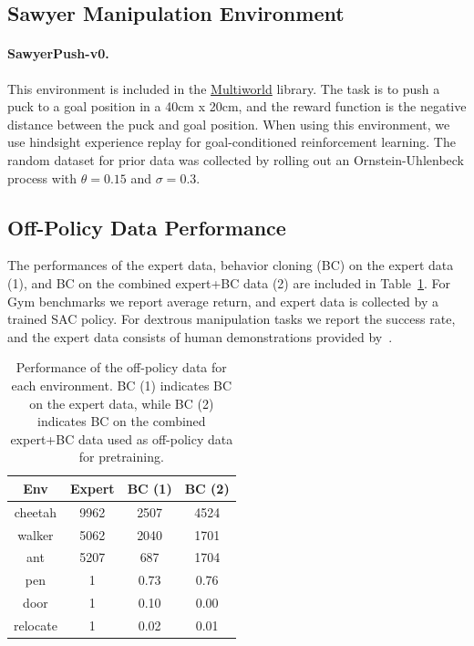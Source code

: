\subsection{Sawyer Manipulation Environment}

\paragraph{SawyerPush-v0.} This environment is included in the \href{https://github.com/vitchyr/multiworld}{Multiworld} library. The task is to push a puck to a goal position in a 40cm x 20cm, and the reward function is the negative distance between the puck and goal position. When using this environment, we use hindsight experience replay for goal-conditioned reinforcement learning. The random dataset for prior data was collected by rolling out an Ornstein-Uhlenbeck process with $\theta = 0.15$ and $\sigma = 0.3$.

\subsection{Off-Policy Data Performance}

The performances of the expert data, behavior cloning (BC) on the expert data (1), and BC on the combined expert+BC data (2) are included in Table~\ref{fig:bc}. For Gym benchmarks we report average return, and expert data is collected by a trained SAC policy. For dextrous manipulation tasks we report the success rate, and the expert data consists of human demonstrations provided by~\citet{rajeswaran2018dextrous}.

\begin{table}[h!]
\footnotesize
\begin{tabular}{c|c|c|c}
Env         & Expert & BC (1) & BC (2) \\ \hline
cheetah & 9962   & 2507         & 4524      \\
walker      & 5062   & 2040         & 1701      \\
ant         & 5207   & 687          & 1704      \\
pen         & 1      & 0.73          & 0.76       \\
door        & 1      & 0.10          & 0.00       \\
relocate    & 1      & 0.02          & 0.01       \\
\end{tabular}
\caption{Performance of the off-policy data for each environment. BC (1) indicates BC on the expert data, while BC (2) indicates BC on the combined expert+BC data used as off-policy data for pretraining. }
\label{fig:bc}
\end{table}

